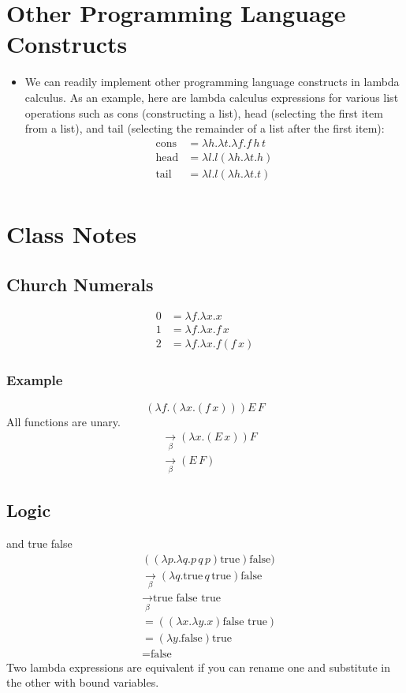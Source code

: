 \documentclass[]{article}
\begin{document}
\section{Other Programming Language Constructs}
\begin{itemize}
\item We can readily implement other programming language constructs in lambda
calculus. As an example, here are lambda calculus expressions for various list
operations such as cons (constructing a list), head (selecting the first item
from a list), and tail (selecting the remainder of a list after the first item):
\begin{align*}
\textrm{cons} &= \lambda h.\lambda t.\lambda f.f\,h\,t\\
\textrm{head} &= \lambda l.l (\lambda h.\lambda t.h)\\
\textrm{tail} &= \lambda l.l (\lambda h.\lambda t.t)\\
\end{align*}
\end{itemize}

\section*{Class Notes}
\subsection*{Church Numerals}
\begin{align*}
0 &= \lambda f.\lambda x.x \\
1 &= \lambda f.\lambda x.f\,x \\
2 &= \lambda f.\lambda x.f(f\,x)
\end{align*}

\subsubsection*{Example}
\[(\lambda f.(\lambda x.(f\,x)))E\,F \]
All functions are unary.
\begin{align*}
&\underset{\beta}{\rightarrow} (\lambda x.(E\,x))F \\
&\underset{\beta}{\rightarrow} (E\,F)
\end{align*}

\subsection*{Logic}
and true false
\begin{align*}
&((\lambda p.\lambda q.p\,q\,p)\textrm{true})\textrm{false}) \\
&\underset{\beta}{\rightarrow}(\lambda
q.\textrm{true}\,q\,\textrm{true})\textrm{false} \\
&\underset{\beta}{\rightarrow}\textrm{true false true}\\
&=((\lambda x.\lambda y.x)\textrm{false true}) \\
&=(\lambda y.\textrm{false})\textrm{true} \\
&=\textrm{false}
\end{align*}
Two lambda expressions are equivalent if you can rename one and substitute in
the other with bound variables.
\end{document}
